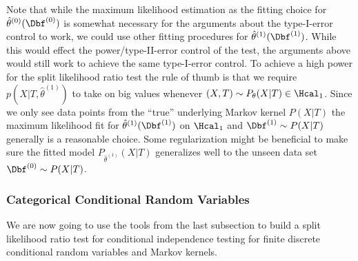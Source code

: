 \begin{Rem}
    Note that while the maximum likelihood estimation as the fitting choice for $\hat \theta^{(0)}(\Dbf^{(0)})$
    is somewhat necessary for the arguments about the type-I-error control to work,
    we could use other fitting procedures for $\hat \theta^{(1)}(\Dbf^{(1)})$. 
    While this would effect the power/type-II-error control of the test, 
    the arguments above would still work to achieve the same type-I-error control.
    To achieve a high power for the split likelihood ratio test the rule of thumb is that we require $p(X|T,\hat \theta^{(1)})$ 
    to take on big values whenever $(X,T) \sim P_\theta(X|T) \in \Hcal_1$.
    Since we only see data points from the ``true'' underlying Markov kernel $P(X|T)$ the maximum likelihood 
    fit for $\hat \theta^{(1)}(\Dbf^{(1)})$ on $\Hcal_1$ and $\Dbf^{(1)} \sim P(X|T)$ generally is a reasonable choice.
    Some regularization might be beneficial to make sure the fitted model $P_{\hat \theta^{(1)}}(X|T)$ generalizes well to 
    the unseen data set $\Dbf^{(0)} \sim P(X|T)$.

\end{Rem}


\subsubsection{Categorical Conditional Random Variables}

We are now going to use the tools from the last subsection to build a split likelihood ratio test for conditional independence testing for finite discrete conditional random variables and Markov kernels.

